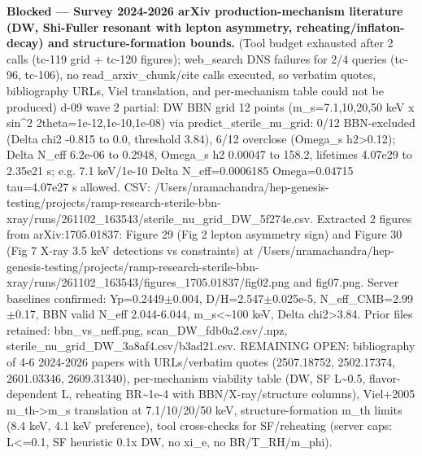 \documentclass[11pt,a4paper]{article}
\begin{document}
\textbf{Blocked --- Survey 2024-2026 arXiv production-mechanism literature (DW, Shi-Fuller resonant with lepton asymmetry, reheating/inflaton-decay) and structure-formation bounds.} (Tool budget exhausted after 2 calls (tc-119 grid + tc-120 figures); web\_search DNS failures for 2/4 queries (tc-96, tc-106), no read\_arxiv\_chunk/cite calls executed, so verbatim quotes, bibliography URLs, Viel translation, and per-mechanism table could not be produced) d-09 wave 2 partial: DW BBN grid 12 points (m\_s=7.1,10,20,50 keV x sin\textasciicircum{}2 2theta=1e-12,1e-10,1e-08) via predict\_sterile\_nu\_grid: 0/12 BBN-excluded (Delta chi2 -0.815 to 0.0, threshold 3.84), 6/12 overclose (Omega\_s h2\textgreater{}0.12); Delta N\_eff 6.2e-06 to 0.2948, Omega\_s h2 0.00047 to 158.2, lifetimes 4.07e29 to 2.35e21 s; e.g. 7.1 keV/1e-10 Delta N\_eff=0.0006185 Omega=0.04715 tau=4.07e27 s allowed. CSV: /Users/nramachandra/hep-genesis-testing/projects/ramp-research-sterile-bbn-xray/runs/261102\_163543/sterile\_nu\_grid\_DW\_5f274e.csv. Extracted 2 figures from arXiv:1705.01837: Figure 29 (Fig 2 lepton asymmetry sign) and Figure 30 (Fig 7 X-ray 3.5 keV detections vs constraints) at /Users/nramachandra/hep-genesis-testing/projects/ramp-research-sterile-bbn-xray/runs/261102\_163543/figures\_1705.01837/fig02.png and fig07.png. Server baselines confirmed: Yp=0.2449$\pm$0.004, D/H=2.547$\pm$0.025e-5, N\_eff\_CMB=2.99$\pm$0.17, BBN valid N\_eff 2.044-6.044, m\_s\textless{}\textasciitilde{}100 keV, Delta chi2\textgreater{}3.84. Prior files retained: bbn\_vs\_neff.png, scan\_DW\_fdb0a2.csv/.npz, sterile\_nu\_grid\_DW\_3a8af4.csv/b3ad21.csv. REMAINING OPEN: bibliography of 4-6 2024-2026 papers with URLs/verbatim quotes (2507.18752, 2502.17374, 2601.03346, 2609.31340), per-mechanism viability table (DW, SF L\textasciitilde{}0.5, flavor-dependent L, reheating BR\textasciitilde{}1e-4 with BBN/X-ray/structure columns), Viel+2005 m\_th-\textgreater{}m\_s translation at 7.1/10/20/50 keV, structure-formation m\_th limits (8.4 keV, 4.1 keV preference), tool cross-checks for SF/reheating (server caps: L\textless{}=0.1, SF heuristic 0.1x DW, no xi\_e, no BR/T\_RH/m\_phi).
\end{document}
